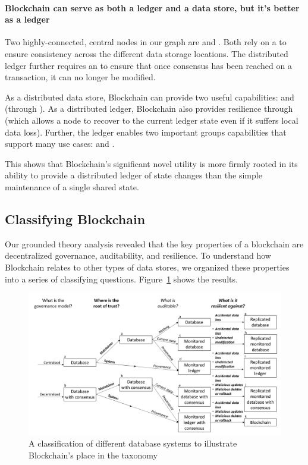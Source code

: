 {\paragraph{Blockchain can serve as both a ledger and a data store, but it's better as a ledger}
Two highly-connected, central nodes in our graph are  and . Both rely on a  to ensure consistency across the different data storage locations. The distributed ledger further requires an  to ensure that once consensus has been reached on a transaction, it can no longer be modified. 

As a distributed data store, Blockchain can provide two useful capabilities:  and  (through ). As a distributed ledger, Blockchain also provides resilience through  (which allows a node to recover to the current ledger state even if it suffers local data loss). Further, the ledger enables two important groups capabilities that support many use cases:  and . 

This shows that Blockchain's significant novel utility is more firmly rooted in its ability to provide a distributed ledger of state changes than the simple maintenance of a single shared state.

\subsection{Classifying Blockchain }

Our grounded theory analysis revealed that the key properties of a blockchain are decentralized governance, auditability, and resilience. To understand how Blockchain relates to other types of data stores, we organized these properties into a series of classifying questions. Figure~\ref{fig:blockchainFlowchart} shows the results.

\begin{figure}
	\centering
	\includegraphics[width=\textwidth]{figures/BlockchainFlowchart.png}
	\caption{A classification of different database systems to illustrate Blockchain's place in the taxonomy}
	\label{fig:blockchainFlowchart}
\end{figure}

}
